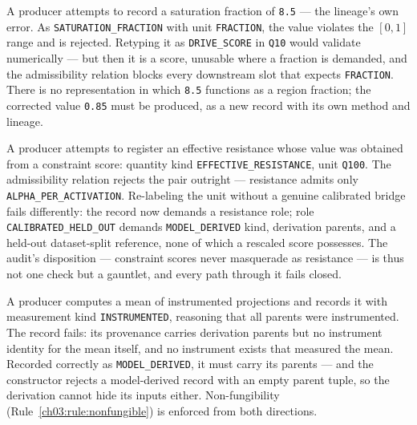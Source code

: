 \begin{example}\label{ch03:ex:rejmixed}
A producer attempts to record a saturation fraction of \texttt{8.5} --- the lineage's own error. As \texttt{SATURATION\_FRACTION} with unit \texttt{FRACTION}, the value violates the $[0,1]$ range and is rejected. Retyping it as \texttt{DRIVE\_SCORE} in \texttt{Q10} would validate numerically --- but then it is a score, unusable where a fraction is demanded, and the admissibility relation blocks every downstream slot that expects \texttt{FRACTION}. There is no representation in which \texttt{8.5} functions as a region fraction; the corrected value \texttt{0.85} must be produced, as a new record with its own method and lineage.
\end{example}

\begin{example}\label{ch03:ex:rejbridge}
A producer attempts to register an effective resistance whose value was obtained from a constraint score: quantity kind \texttt{EFFECTIVE\_RESISTANCE}, unit \texttt{Q100}. The admissibility relation rejects the pair outright --- resistance admits only \texttt{ALPHA\_PER\_ACTIVATION}. Re-labeling the unit without a genuine calibrated bridge fails differently: the record now demands a resistance role; role \texttt{CALIBRATED\_HELD\_OUT} demands \texttt{MODEL\_DERIVED} kind, derivation parents, and a held-out dataset-split reference, none of which a rescaled score possesses. The audit's disposition --- constraint scores never masquerade as resistance --- is thus not one check but a gauntlet, and every path through it fails closed.
\end{example}

\begin{example}\label{ch03:ex:rejlaundered}
A producer computes a mean of instrumented projections and records it with measurement kind \texttt{INSTRUMENTED}, reasoning that all parents were instrumented. The record fails: its provenance carries derivation parents but no instrument identity for the mean itself, and no instrument exists that measured the mean. Recorded correctly as \texttt{MODEL\_DERIVED}, it must carry its parents --- and the constructor rejects a model-derived record with an empty parent tuple, so the derivation cannot hide its inputs either. Non-fungibility (Rule~\ref{ch03:rule:nonfungible}) is enforced from both directions.
\end{example}

